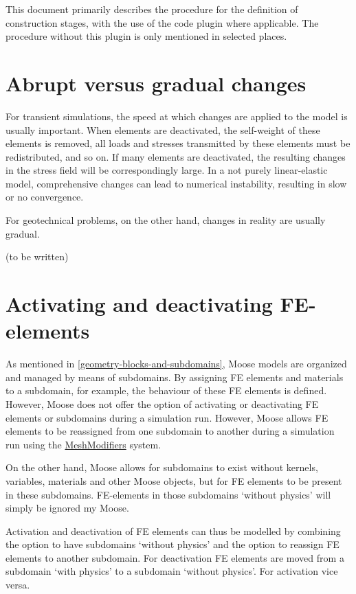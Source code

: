 This document primarily describes the procedure for the definition of
construction stages, with the use of the \codeword{[Stages]} code plugin where
applicable. The procedure without this plugin is only mentioned in selected
places.

\section{Abrupt versus gradual changes}
\label{chap:stages-gradual-changes}

For transient simulations, the speed at which changes are applied to the model
is usually important. When elements are deactivated, the self-weight of these
elements is removed, all loads and stresses transmitted by these elements must
be redistributed, and so on. If many elements are deactivated, the resulting
changes in the stress field will be correspondingly large. In a not purely
linear-elastic model, comprehensive changes can lead to numerical instability,
resulting in slow or no convergence.

For geotechnical problems, on the other hand, changes in reality are usually
gradual.

(to be written)

\section{Activating and deactivating FE-elements}
\label{chap:stages-element-activation-deactivation}

As mentioned in \autoref{geometry-blocks-and-subdomains}, Moose models are
organized and managed by means of subdomains. By assigning FE elements and
materials to a subdomain, for example, the behaviour of these FE elements is
defined. However, Moose does not offer the option of activating or deactivating
FE elements or subdomains during a simulation run. However, Moose allows FE
elements to be reassigned from one subdomain to another during a simulation run
using the
\href{https://mooseframework.inl.gov/syntax/MeshModifiers/index.html}{MeshModifiers}
system.

On the other hand, Moose allows for subdomains to exist without kernels,
variables, materials and other Moose objects, but for FE elements to be present
in these subdomains. FE-elements in those subdomains ‘without physics’ will
simply be ignored my Moose.

Activation and deactivation of FE elements can thus be modelled by combining
the option to have subdomains ‘without physics’ and the option to reassign FE
elements to another subdomain. For deactivation FE elements are moved from a
subdomain ‘with physics’ to a subdomain ‘without physics’. For activation vice
versa.


